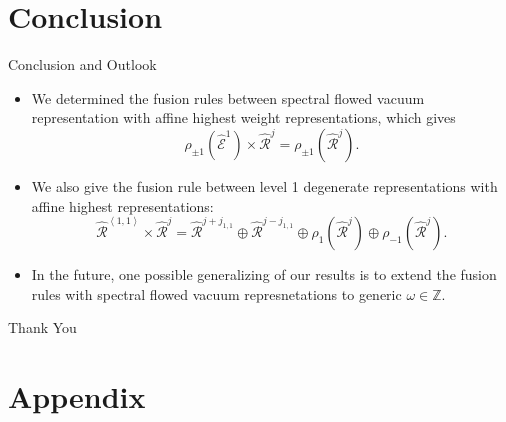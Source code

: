 \documentclass{beamer}
\newcommand{\vev}[1]{\left\langle #1 \right\rangle}
\begin{document}
\section{Conclusion}

\begin{frame}{Conclusion and Outlook}
  \begin{itemize}
    \item We determined the fusion rules between spectral flowed vacuum representation with affine highest weight representations, which 
        gives 
        \begin{equation*}
          \rho_{\pm 1} \left( \hat{\mathcal{E}}^{1} \right) \times \hat{\mathcal{R}}^{j} = \rho_{\pm 1} \left( \hat{\mathcal{R}}^{j} \right).
        \end{equation*}
    \item We also give the fusion rule between level 1 degenerate representations 
          with affine highest representations: 
        \begin{equation*}
           \widehat{\mathcal{R}}^{\vev{1,1}} \times \widehat{\mathcal{R}}^{j} = \widehat{\mathcal{R}}^{j+j_{1,1}} \oplus \widehat{\mathcal{R}}^{j-j_{1,1}}
            \oplus \rho_{1} \left( \widehat{\mathcal{R}}^{j} \right) \oplus \rho_{-1} \left( \widehat{\mathcal{R}}^{j} \right). 
        \end{equation*}
    \item In the future, one possible generalizing of our results is to extend the fusion rules with spectral flowed vacuum represnetations 
          to generic $\omega \in \mathbb{Z}$.
  \end{itemize}
\end{frame}


\begin{frame}[plain]
  \vfill
  \begin{center}
    \Huge Thank You
  \end{center}
  \vfill
\end{frame}

\section*{Appendix}
\end{document}
